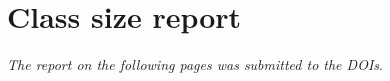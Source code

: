 \chapter{Class size report}\label{app:sec:classsize}
\emph{The report on the following pages was submitted to the DOIs}.


